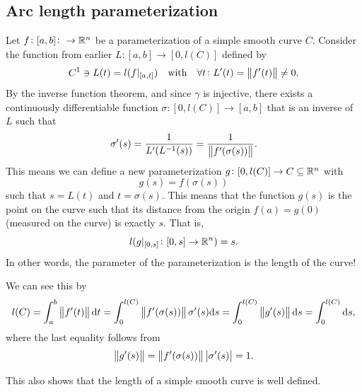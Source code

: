 \documentclass[11pt,a4paper]{article}
\begin{document}
\subsection{Arc length parameterization}
Let $f \colon [a,b] \colon \to \mathbb{R}^n$ be a parameterization of a simple
smooth curve $C$.
Consider the function from earlier $L \colon [a,b] \to [0,l(C)]$ defined
by
\[
  C^1\ni L(t) = l(f\vert_{[a,t]}) \quad\text{with}\quad
  \forall t \colon L'(t) = \left\lVert f'(t)\right\rVert \neq 0.
\]
By the inverse function theorem, and since $\gamma$ is injective,
there exists a continuously differentiable
function $\sigma \colon [0,l(C)] \to [a,b]$ that is an inverse of $L$ such that
\begin{equation}
  \label{eq:inverse}
  \sigma'(s) =
  \frac{1}{L'(L^{-1}(s))} =
  \frac{1}{\left\lVert f'(\sigma(s))\right\rVert}.
\end{equation}
This means we can define a new parameterization
$g \colon [0,l(C)] \to C \subseteq \mathbb{R}^n$ with
\[
  g(s) = f(\sigma(s))
\]
such that $s = L(t)$ and $t = \sigma(s)$.
This means that the function $g(s)$ is the point on the curve such that
its distance from the origin $f(a) = g(0)$ (measured on the curve)
is exactly $s$. That is,
\[
  l(g\vert_{[0,s]} \colon [0,s] \to \mathbb{R}^n) = s.
\]
In other words,
the parameter of the parameterization is the length of the curve!

We can see this by
\[
  l(C) =
  \int_{a}^{b} \left\lVert f'(t)\right\rVert \mathrm{d} t =
  \int_{0}^{l(C)} \left\lVert f'(\sigma(s))\right\rVert \sigma'(s) \mathrm{d} s =
  \int_{0}^{l(C)} \left\lVert g'(s)\right\rVert \mathrm{d} s =
  \int_{0}^{l(C)} \mathrm{d} s,
\]
where the last equality follows from 
\[
  \left\lVert g'(s)\right\rVert = \left\lVert f'(\sigma(s))\right\rVert \left\lvert\sigma'(s)\right\rvert = 1.
\]
\begin{remark}
  This also shows that the length of a simple smooth curve is well defined.
\end{remark}
\end{document}
